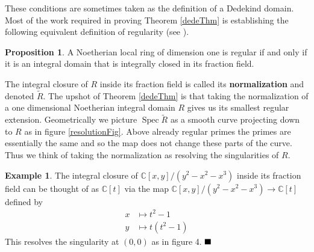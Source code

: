 \documentclass{article}
\DeclareMathOperator{\Spec}{Spec}
\newcommand{\C}{\ensuremath{\mathbb{C}}}
\theoremstyle{definition}
\newcounter{dummy} \numberwithin{dummy}{section}
\newtheorem{prop}[dummy]{Proposition}
\newtheorem{example}[dummy]{Example}
\begin{document}
These conditions are sometimes  taken as the definition of a Dedekind domain.
Most of the work required in proving Theorem \ref{dedeThm} is establishing the following equivalent definition of regularity (see \citeauthor[12.5.8g]{vakil2017rising}).
\begin{prop}
  A Noetherian local ring of dimension one is regular if and only if it is an integral domain that is integrally closed in its fraction field.
\end{prop}

The integral closure of $R$ inside its fraction field is called its \textbf{normalization} and denoted $\widetilde{R}$.
The upshot of Theorem \ref{dedeThm} is that taking the normalization of a one dimensional Noetherian integral domain $R$ gives us its smallest regular extension. 
Geometrically we picture $\Spec \widetilde{R}$ as a smooth curve projecting down to $R$ as in figure \ref{resolutionFig}.
Above already regular primes the primes are essentially the same and so the map does not change these parts of the curve.
Thus we think of taking the normalization as resolving the singularities of $R$.

\begin{example}
  The integral closure of $\C[x,y]/(y^2-x^2-x^3)$ inside its fraction field can be thought of as $\C[t]$ via the map $\C[x,y]/(y^2-x^2-x^3) \to \C[t]$ defined by
  \begin{align*}
    x &\mapsto t^2-1\\
    y &\mapsto t(t^2-1)
  \end{align*}
  This resolves the singularity at $(0,0)$ as in figure 4.
  $\hfill\blacksquare$
\end{example}
\end{document}
